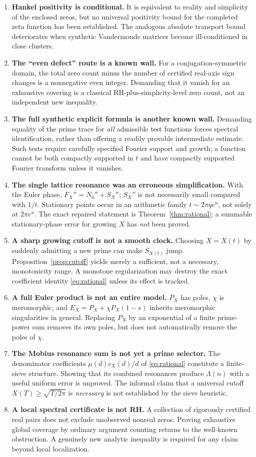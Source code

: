 \documentclass[11pt,a4paper]{article}
\numberwithin{equation}{section}
\newcommand{\status}[1]{\textbf{#1}}
\begin{document}
\begin{enumerate}[leftmargin=*,itemsep=2.5pt]
\item \status{Hankel positivity is conditional.} It is equivalent to reality and simplicity of the enclosed zeros, but no universal positivity bound for the completed zeta function has been established. The analogous absolute transport bound deteriorates when synthetic Vandermonde matrices become ill-conditioned in close clusters.
\item \status{The ``even defect'' route is a known wall.} For a conjugation-symmetric domain, the total zero count minus the number of certified real-axis sign changes is a nonnegative even integer. Demanding that it vanish for an exhaustive covering is a classical RH-plus-simplicity-level zero count, not an independent new inequality.
\item \status{The full synthetic explicit formula is another known wall.} Demanding equality of the prime trace for \emph{all} admissible test functions forces spectral identification, rather than offering a readily provable intermediate estimate. Such tests require carefully specified Fourier support and growth; a function cannot be both compactly supported in $t$ and have compactly supported Fourier transform unless it vanishes.
\item \status{The single lattice resonance was an erroneous simplification.} With the Euler phase, $F_X''=N_0''+S_X''$; $S_X''$ is not necessarily small compared with $1/t$. Stationary points occur in an arithmetic family $t\sim2\pi q e^u$, not solely at $2\pi e^u$. The exact repaired statement is Theorem~\ref{thm:rational}; a summable stationary-phase error for growing $X$ has \emph{not} been proved.
\item \status{A sharp growing cutoff is not a smooth clock.} Choosing $X=X(t)$ by suddenly admitting a new prime can make $S_{X(t)}$ jump. Proposition~\ref{prop:cutoff} yields merely a sufficient, not a necessary, monotonicity range. A monotone regularization may destroy the exact coefficient identity \eqref{eq:rational} unless its effect is tracked.
\item \status{A full Euler product is not an entire model.} $P_X$ has poles, $\chi$ is meromorphic, and $E_X=P_X+\chi P_X(1-s)$ inherits meromorphic singularities in general. Replacing $P_X$ by an exponential of a finite prime-power sum removes its own poles, but does not automatically remove the poles of $\chi$.
\item \status{The Mobius resonance sum is not yet a prime selector.} The denominator coefficients $\mu(d)c_X(d)/d$ of \eqref{eq:rational} constitute a finite-sieve structure. Showing that its combined resonances produce $\Lambda(n)$ with a useful uniform error is unproved. The informal claim that a universal cutoff $X(T)\ge\sqrt{T/2\pi}$ is \emph{necessary} is not established by the sieve heuristic.
\item \status{A local spectral certificate is not RH.} A collection of rigorously certified real pairs does not exclude unobserved nonreal zeros. Proving exhaustive global coverage by ordinary argument counting returns to the well-known obstruction. A genuinely new analytic inequality is required for any claim beyond local localization.
\end{enumerate}
\end{document}
